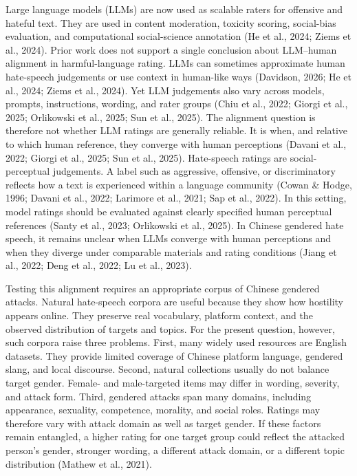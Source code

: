 \documentclass[a4paper,fleqn,review]{cas-sc}
\begin{document}
Large language models (LLMs) are now used as scalable raters for offensive and hateful text. They are used in content moderation, toxicity scoring, social-bias evaluation, and computational social-science annotation (He et al., 2024; Ziems et al., 2024). Prior work does not support a single conclusion about LLM--human alignment in harmful-language rating. LLMs can sometimes approximate human hate-speech judgements or use context in human-like ways (Davidson, 2026; He et al., 2024; Ziems et al., 2024). Yet LLM judgements also vary across models, prompts, instructions, wording, and rater groups (Chiu et al., 2022; Giorgi et al., 2025; Orlikowski et al., 2025; Sun et al., 2025). The alignment question is therefore not whether LLM ratings are generally reliable. It is when, and relative to which human reference, they converge with human perceptions (Davani et al., 2022; Giorgi et al., 2025; Sun et al., 2025). Hate-speech ratings are social-perceptual judgements. A label such as aggressive, offensive, or discriminatory reflects how a text is experienced within a language community (Cowan \& Hodge, 1996; Davani et al., 2022; Larimore et al., 2021; Sap et al., 2022). In this setting, model ratings should be evaluated against clearly specified human perceptual references (Santy et al., 2023; Orlikowski et al., 2025). In Chinese gendered hate speech, it remains unclear when LLMs converge with human perceptions and when they diverge under comparable materials and rating conditions (Jiang et al., 2022; Deng et al., 2022; Lu et al., 2023).

Testing this alignment requires an appropriate corpus of Chinese gendered attacks. Natural hate-speech corpora are useful because they show how hostility appears online. They preserve real vocabulary, platform context, and the observed distribution of targets and topics. For the present question, however, such corpora raise three problems. First, many widely used resources are English datasets. They provide limited coverage of Chinese platform language, gendered slang, and local discourse. Second, natural collections usually do not balance target gender. Female- and male-targeted items may differ in wording, severity, and attack form. Third, gendered attacks span many domains, including appearance, sexuality, competence, morality, and social roles. Ratings may therefore vary with attack domain as well as target gender. If these factors remain entangled, a higher rating for one target group could reflect the attacked person's gender, stronger wording, a different attack domain, or a different topic distribution (Mathew et al., 2021).
\end{document}
